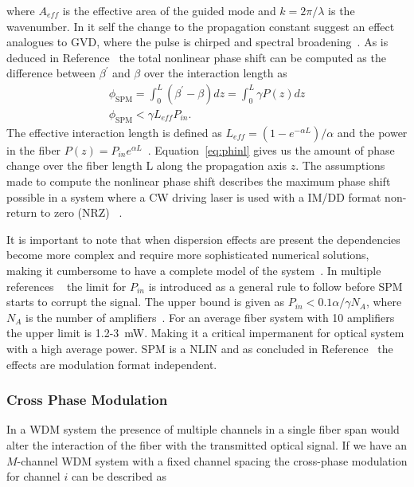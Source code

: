 where $A_{eff}$ is the effective area of the guided mode and $k=2\pi/\lambda$ is the wavenumber. In it self the change to the propagation constant suggest an effect analogues to GVD, where the pulse is chirped and spectral broadening~\cite{agrawal2000nonlinear}. As is deduced in Reference~\cite{le2015advanced} the total nonlinear phase shift can be computed as the difference between $\beta^\prime$ and $\beta$ over the interaction length as  
\begin{subequations}
\begin{gather}
\phi_{\text{SPM}}=\int_0^L(\beta^\prime-\beta)dz=\int_0^L\gamma P(z)dz\\
\phi_{\text{SPM}}<\gamma L_{eff}P_{in}.
\end{gather}
\label{eq:phinl}
\end{subequations}
The effective interaction length is defined as $L_{eff}=(1-e^{-\alpha L})/\alpha$ and the power in the fiber $P(z)=P_{in}e^{\alpha L}$~\cite{le2015advanced}. Equation~\ref{eq:phinl} gives us the amount of phase change over the fiber length L along the propagation axis $z$. The assumptions made to compute the nonlinear phase shift describes the maximum phase shift possible in a system where a CW driving laser is used with a IM/DD format non-return to zero (NRZ) ~\cite{agrawal2001applications,FiberAgrawal,le2015advanced}. 

It is important to note that when dispersion effects are present the dependencies become more complex and require more sophisticated numerical solutions, making it cumbersome to have a complete model of the system~\cite{agrawal2001applications,gordon1990phase}.  In multiple references ~\cite{le2015advanced,FiberAgrawal,agrawal2000nonlinear} the limit for $P_{in}$ is introduced as a general rule to follow before SPM starts to corrupt the signal.  The upper bound  is given as $P_{in}<0.1\alpha/\gamma N_{A}$, where $N_{A}$ is the number of amplifiers~\cite{le2015advanced}. For  an average fiber system with 10 amplifiers the upper limit is 1.2-3~mW. Making it a critical impermanent for optical system with a high average power. SPM is a NLIN and as concluded in Reference~\cite{dris2017analysis} the effects are modulation format independent.



\subsubsection{Cross Phase Modulation}
In a WDM system the presence of multiple channels in a single fiber span would alter the interaction of the fiber with the transmitted optical signal.  If we have an $M$-channel WDM system with a fixed channel spacing the cross-phase modulation for channel $i$ can be described as
 
